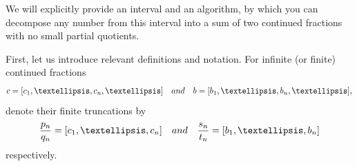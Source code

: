 \documentclass{amsart}
\newtheorem{proposition}[theorem]{Proposition}
\theoremstyle{definition}
\newcommand{\N}{\mathbb N}%
\newcommand{\0}{\mbf 0}%
\renewcommand{\text}{\textup}
\def\N{\mathbb N}
\begin{document}
We will explicitly provide an interval and an algorithm, by which you can decompose any number from this interval into a sum of two continued fractions with no small partial quotients.

First, let us introduce relevant definitions and notation.
For infinite (or finite) continued fractions 
$$c=[c_1,\ldots,c_n,\ldots] \quad \text{ and }\quad
 b=[b_1,\ldots,b_n,\ldots],$$
denote their finite truncations by 
\begin{equation}\label{def:pq:st}
\frac{p_n}{q_n} = [c_1,\ldots,c_n] \quad \text{ and } \quad \frac{s_n}{t_n} = [b_1,\ldots,b_n]
\end{equation}
respectively.



\end{document}
